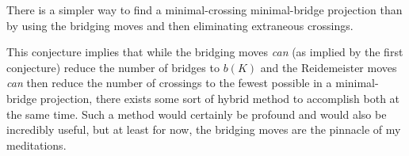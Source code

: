 \documentclass[titlepage,11pt]{article}
\begin{document}
\begin{conj}
    There is a simpler way to find a minimal-crossing minimal-bridge projection than by using the bridging moves and then eliminating extraneous crossings.
\end{conj}

This conjecture implies that while the bridging moves \emph{can} (as implied by the first conjecture) reduce the number of bridges to $b(K)$ and the Reidemeister moves \emph{can} then reduce the number of crossings to the fewest possible in a minimal-bridge projection, there exists some sort of hybrid method to accomplish both at the same time. Such a method would certainly be profound and would also be incredibly useful, but at least for now, the bridging moves are the pinnacle of my meditations.
\newpage
\end{document}

